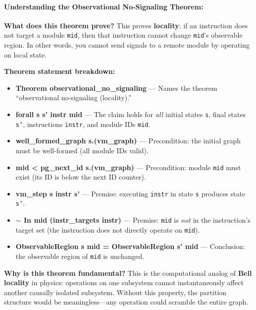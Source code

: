 \paragraph{Understanding the Observational No-Signaling Theorem:}

\textbf{What does this theorem prove?} This proves \textbf{locality}: if an instruction does not target a module \texttt{mid}, then that instruction cannot change \texttt{mid}'s observable region. In other words, you cannot send signals to a remote module by operating on local state.

\textbf{Theorem statement breakdown:}
\begin{itemize}
    \item \textbf{Theorem observational\_no\_signaling} — Names the theorem ``observational no-signaling (locality).''
    \item \textbf{forall s s' instr mid} — The claim holds for \textit{all} initial states \texttt{s}, final states \texttt{s'}, instructions \texttt{instr}, and module IDs \texttt{mid}.
    \item \textbf{well\_formed\_graph s.(vm\_graph)} — Precondition: the initial graph must be well-formed (all module IDs valid).
    \item \textbf{mid < pg\_next\_id s.(vm\_graph)} — Precondition: module \texttt{mid} must exist (its ID is below the next ID counter).
    \item \textbf{vm\_step s instr s'} — Premise: executing \texttt{instr} in state \texttt{s} produces state \texttt{s'}.
    \item \textbf{$\sim$ In mid (instr\_targets instr)} — Premise: \texttt{mid} is \textit{not} in the instruction's target set (the instruction does not directly operate on \texttt{mid}).
    \item \textbf{ObservableRegion s mid = ObservableRegion s' mid} — Conclusion: the observable region of \texttt{mid} is unchanged.
\end{itemize}

\textbf{Why is this theorem fundamental?} This is the computational analog of \textbf{Bell locality} in physics: operations on one subsystem cannot instantaneously affect another causally isolated subsystem. Without this property, the partition structure would be meaningless---any operation could scramble the entire graph.

